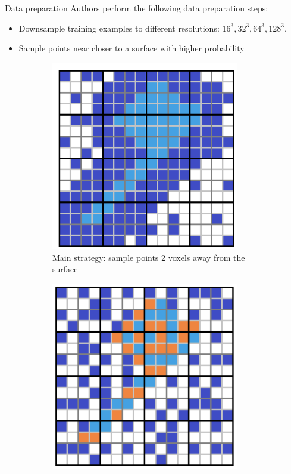 \documentclass[handout, 10pt]{beamer}
\begin{document}
\begin{frame}{Data preparation}
Authors perform the following data preparation steps:
    \begin{itemize}
        \item\pause Downsample training examples to different resolutions: $16^3, 32^3, 64^3, 128^3$.
        \item\pause Sample points near closer to a surface with higher probability
    \end{itemize}
    \begin{figure}
        \begin{subfigure}{.45\textwidth}
            \centering
            \includegraphics[width=0.9\textwidth]{images/sampling-strategy-1}
            \caption{Main strategy: sample points 2 voxels away from the surface}
        \end{subfigure}
        \begin{subfigure}{.45\textwidth}
            \centering
            \includegraphics[width=0.9\textwidth]{images/sampling-strategy-2}

\end{subfigure}
\end{figure}
\end{frame}
\end{document}
